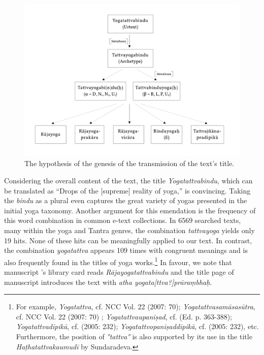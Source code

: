   \begin{figure}[h!]
    \centering
    \includegraphics[width=1\textwidth]{pics/titel-hypothese.pdf} %
    \caption{The hypothesis of the genesis of the transmission of the text's title.}
    \label{fig:titel-hypothese}
\end{figure}

Considering the overall content of the text, the title \textit{Yogatattvabindu}, which can be translated as ``Drops of the [supreme] reality of yoga,'' is convincing. Taking the \textit{bindu} as a plural even captures the great variety of yogas presented in the initial yoga taxonomy. Another argument for this emendation is the frequency of this word combination in common e-text collections. In 6569 searched texts, many within the yoga and Tantra genres, the combination \textit{tattvayoga} yields only 19 hits. None of these hits can be meaningfully applied to our text. In contrast, the combination \textit{yogatattva} appears 109 times with congruent meanings and is also frequently found in the titles of yoga works.\footnote{For example, \emph{Yogatattva}, cf. NCC Vol. 22 (2007: 70); \emph{Yogatattvasamāsasūtra}, cf. NCC Vol. 22 (2007: 70) \nocite{newcataloguscatalogorum22}; \emph{Yogatattvaupaniṣad}, cf.  (Ed. p. 363-388); \emph{Yogatattvadīpikā}, cf.  (2005: 232); \emph{Yogatattvopaniṣaddīpikā}, cf.  (2005: 232), etc. Furthermore, the position of \emph{°tattva°} is also supported by its use in the title \emph{Haṭhatattvakaumudī} by Sundaradeva.} In favour, we note that manuscript 's library card reads \textit{Rājayogatattvabindu} and the title page of manuscript  introduces the text with \textit{atha yogata[ttva?]prāraṃbhaḥ}. 

